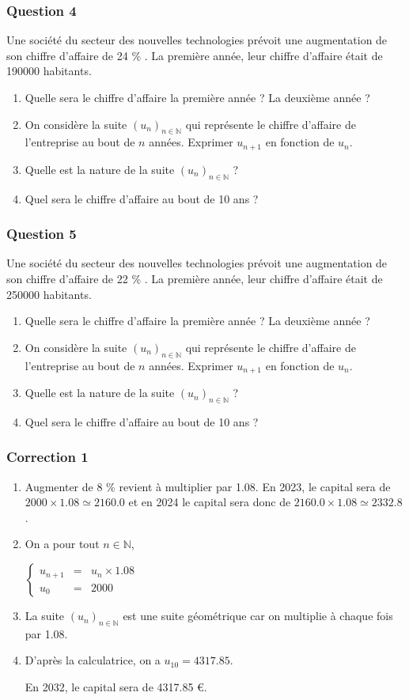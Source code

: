 \documentclass[15pt, mathserif]{beamer}
\newcommand{\N}{\mathbb{N}}			%
\newcommand{\st}[1]{$(#1_n)_{n \in \N}$}
\begin{document}
\begin{frame} 
	\frametitle{Question 4}
 Une société du secteur des nouvelles technologies prévoit une augmentation de son chiffre d'affaire de 24 \% . La première année, leur chiffre d'affaire était de  190000 habitants. 
 \begin{enumerate} 
 	 \item Quelle sera le chiffre d'affaire la première année ? La deuxième année ? 
 	 \item On considère la suite \st{u} qui représente le chiffre d'affaire de l'entreprise au bout de $n$ années. Exprimer $u_{n+1}$ en fonction de $u_n$. 
 	 \item Quelle est la nature de la suite \st{u} ? 
 	 \item Quel sera le chiffre d'affaire au bout de 10 ans ? 
 \end{enumerate} \end{frame}


\begin{frame} 
	\frametitle{Question 5}
 Une société du secteur des nouvelles technologies prévoit une augmentation de son chiffre d'affaire de 22 \% . La première année, leur chiffre d'affaire était de  250000 habitants. 
 \begin{enumerate} 
 	 \item Quelle sera le chiffre d'affaire la première année ? La deuxième année ? 
 	 \item On considère la suite \st{u} qui représente le chiffre d'affaire de l'entreprise au bout de $n$ années. Exprimer $u_{n+1}$ en fonction de $u_n$. 
 	 \item Quelle est la nature de la suite \st{u} ? 
 	 \item Quel sera le chiffre d'affaire au bout de 10 ans ? 
 \end{enumerate} \end{frame}


\begin{frame}
\vspace{-10mm}
	\frametitle{Correction 1}
\begin{enumerate} 
 	 \item Augmenter de 8 \% revient à multiplier par  1.08. En 2023, le capital sera de $2000 \times  1.08\simeq 2160.0$ et en 2024 le capital sera donc de  $2160.0 \times  1.08\simeq 2332.8$.  
 	 \item On a pour tout $n \in \N$, 
 
 \hfil$\left\{\begin{array}{rcl} 
 u_{n+1} & = & u_n \times  1.08\\ u_0 & = &  2000\end{array} \right.$ 
 	 \item La suite \st{u} est une suite géométrique car on multiplie à chaque fois par  1.08. 
 	 \item D'après la calculatrice, on a $u_{10}=4317.85$. 
 
 En 2032, le capital sera de 4317.85 \euro. 
 \end{enumerate} 
 
 \end{frame}
\end{document}

